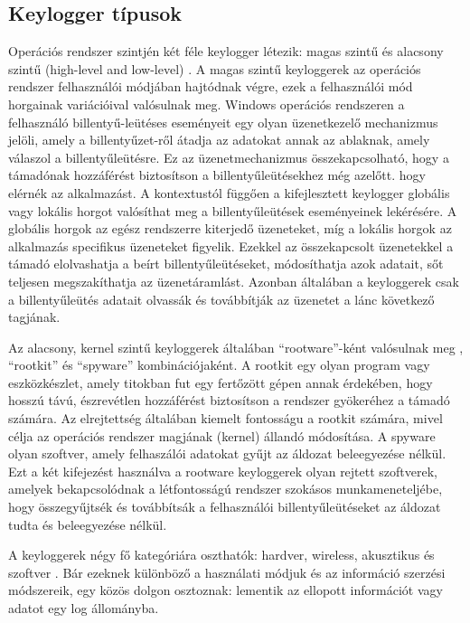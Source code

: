 \documentclass[a4paper, 11pt]{article}
\begin{document}
\subsection{Keylogger típusok}
Operációs rendszer szintjén két féle keylogger létezik: magas szintű és alacsony szintű (high-level and low-level) \cite{wood2010keyloggers}. A magas szintű keyloggerek az operációs rendszer felhasználói módjában hajtódnak végre, ezek a felhasználói mód horgainak variációival valósulnak meg. Windows operációs rendszeren a felhasználó billentyű-leütéses eseményeit egy olyan üzenetkezelő mechanizmus jelöli, amely a billentyűzet-ről átadja az adatokat annak az ablaknak, amely válaszol a billentyűleütésre. Ez az üzenetmechanizmus összekapcsolható, hogy a támadónak hozzáférést biztosítson a billentyűleütésekhez még azelőtt. hogy elérnék az alkalmazást. A kontextustól függően a kifejlesztett keylogger globális vagy lokális horgot valósíthat meg a billentyűleütések eseményeinek lekérésére. A globális horgok az egész rendszerre kiterjedő üzeneteket, míg a lokális horgok az alkalmazás specifikus üzeneteket figyelik. Ezekkel az összekapcsolt üzenetekkel a támadó elolvashatja a beírt billentyűleütéseket, módosíthatja azok adatait, sőt teljesen megszakíthatja az üzenetáramlást. Azonban általában a keyloggerek csak a billentyűleütés adatait olvassák és továbbítják az üzenetet a lánc következő tagjának.

Az alacsony, kernel szintű keyloggerek általában ``rootware''-ként valósulnak meg \cite{butler2006r2}, ``rootkit'' és ``spyware'' kombinációjaként. A rootkit egy olyan program vagy eszközkészlet, amely titokban fut egy fertőzött gépen annak érdekében, hogy hosszú távú, észrevétlen hozzáférést biztosítson a rendszer gyökeréhez a támadó számára. Az elrejtettség általában kiemelt fontosságu a rootkit számára, mivel célja az operációs rendszer magjának (kernel) állandó módosítása. A spyware olyan szoftver, amely felhaszálói adatokat gyűjt az áldozat beleegyezése nélkül. Ezt a két kifejezést használva a rootware keyloggerek olyan rejtett szoftverek, amelyek bekapcsolódnak a létfontosságú rendszer szokásos munkameneteljébe, hogy összegyűjtsék és továbbítsák a felhasználói billentyűleütéseket az áldozat tudta és beleegyezése nélkül.

A keyloggerek négy fő kategóriára oszthatók: hardver, wireless, akusztikus és szoftver \cite{ahmed2014survey}. Bár ezeknek különböző a használati módjuk és az információ szerzési módszereik, egy közös dolgon osztoznak: lementik az ellopott információt vagy adatot egy log állományba.
\end{document}
